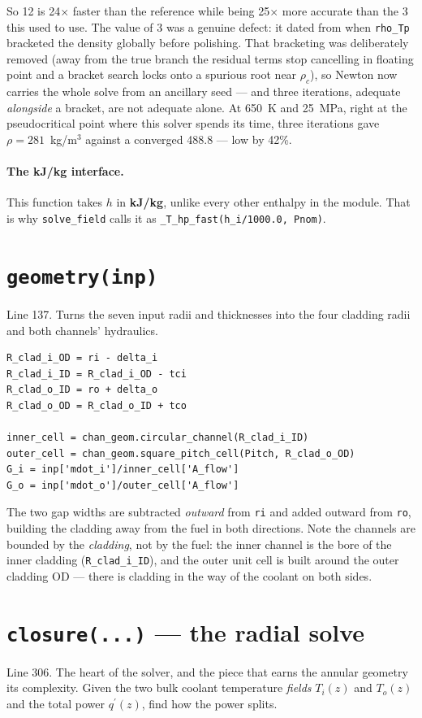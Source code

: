 \documentclass[11pt]{article}
\newcommand{\code}[1]{\texttt{#1}}
\newcommand{\qp}{q^{\prime}}
\begin{document}
So 12 is 24$\times$ faster than the reference while being 25$\times$ more accurate than the
3 this used to use. The value of 3 was a genuine defect: it dated from when
\code{rho\_Tp} bracketed the density globally before polishing. That bracketing was
deliberately removed (away from the true branch the residual terms stop cancelling in
floating point and a bracket search locks onto a spurious root near $\rho_c$), so Newton
now carries the whole solve from an ancillary seed --- and three iterations, adequate
\emph{alongside} a bracket, are not adequate alone. At 650~K and 25~MPa, right at the
pseudocritical point where this solver spends its time, three iterations gave
$\rho = 281$~kg/m$^3$ against a converged 488.8 --- low by 42\%.

\paragraph{The kJ/kg interface.} This function takes $h$ in \textbf{kJ/kg}, unlike every
other enthalpy in the module. That is why \code{solve\_field} calls it as
\code{\_T\_hp\_fast(h\_i/1000.0, Pnom)}.

\section{\code{geometry(inp)}}
Line 137. Turns the seven input radii and thicknesses into the four cladding radii and
both channels' hydraulics.

\begin{lstlisting}
R_clad_i_OD = ri - delta_i
R_clad_i_ID = R_clad_i_OD - tci
R_clad_o_ID = ro + delta_o
R_clad_o_OD = R_clad_o_ID + tco

inner_cell = chan_geom.circular_channel(R_clad_i_ID)
outer_cell = chan_geom.square_pitch_cell(Pitch, R_clad_o_OD)
G_i = inp['mdot_i']/inner_cell['A_flow']
G_o = inp['mdot_o']/outer_cell['A_flow']
\end{lstlisting}

The two gap widths are subtracted \emph{outward} from \code{ri} and added outward from
\code{ro}, building the cladding away from the fuel in both directions. Note the channels
are bounded by the \emph{cladding}, not by the fuel: the inner channel is the bore of the
inner cladding (\code{R\_clad\_i\_ID}), and the outer unit cell is built around the outer
cladding OD --- there is cladding in the way of the coolant on both sides.

\section{\code{closure(...)} --- the radial solve}
\label{sec:closure}
Line 306. The heart of the solver, and the piece that earns the annular geometry its
complexity. Given the two bulk coolant temperature \emph{fields} $T_i(z)$ and $T_o(z)$
and the total power $\qp(z)$, find how the power splits.
\end{document}
